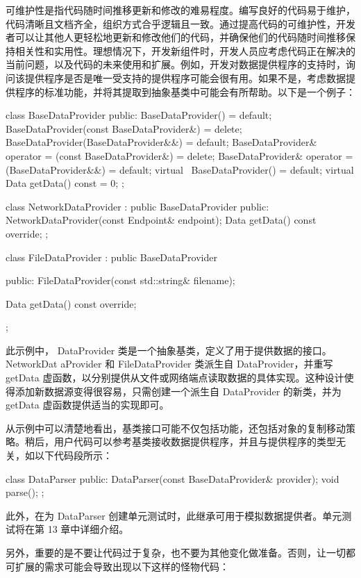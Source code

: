
可维护性是指代码随时间推移更新和修改的难易程度。编写良好的代码易于维护，代码清晰且文档齐全，组织方式合乎逻辑且一致。通过提高代码的可维护性，开发者可以让其他人更轻松地更新和修改他们的代码，并确保他们的代码随时间推移保持相关性和实用性。理想情况下，开发新组件时，开发人员应考虑代码正在解决的当前问题，以及代码的未来使用和扩展。例如，开发对数据提供程序的支持时，询问该提供程序是否是唯一受支持的提供程序可能会很有用。如果不是，考虑数据提供程序的标准功能，并将其提取到抽象基类中可能会有所帮助。以下是一个例子：

\begin{cpp}
class BaseDataProvider {
public:
    BaseDataProvider() = default;
    BaseDataProvider(const BaseDataProvider&) = delete;
    BaseDataProvider(BaseDataProvider&&) = default;
    BaseDataProvider& operator = (const BaseDataProvider&) = delete;
    BaseDataProvider& operator = (BaseDataProvider&&) = default;
    virtual ~BaseDataProvider() = default;
    virtual Data getData() const = 0;
};

class NetworkDataProvider : public BaseDataProvider {
public:
    NetworkDataProvider(const Endpoint& endpoint);
    Data getData() const override;
};

class FileDataProvider : public BaseDataProvider {
public:
    FileDataProvider(const std::string& filename);

    Data getData() const override;
};
\end{cpp}

此示例中， DataProvider 类是一个抽象基类，定义了用于提供数据的接口。 NetworkDat aProvider 和 FileDataProvider 类派生自 DataProvider，并重写 getData 虚函数，以分别提供从文件或网络端点读取数据的具体实现。这种设计使得添加新数据源变得很容易，只需创建一个派生自 DataProvider 的新类，并为 getData 虚函数提供适当的实现即可。

从示例中可以清楚地看出，基类接口可能不仅包括功能，还包括对象的复制移动策略。稍后，用户代码可以参考基类接收数据提供程序，并且与提供程序的类型无关，如以下代码段所示：

\begin{cpp}
class DataParser {
public:
    DataParser(const BaseDataProvider& provider);
    void parse();
};
\end{cpp}

此外，在为 DataParser 创建单元测试时，此继承可用于模拟数据提供者。单元测试将在第 13 章中详细介绍。

另外，重要的是不要让代码过于复杂，也不要为其他变化做准备。否则，让一切都可扩展的需求可能会导致出现以下这样的怪物代码：

